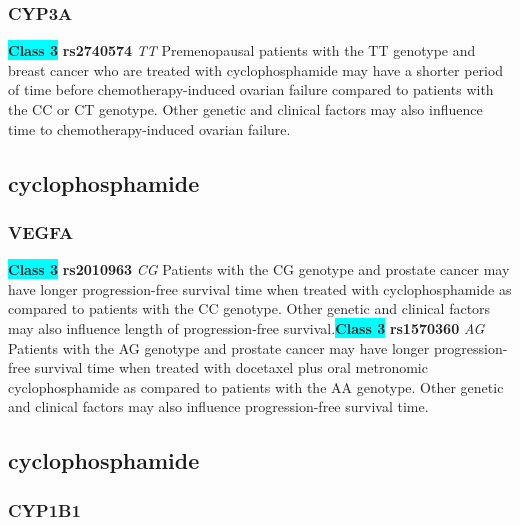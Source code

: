 \documentclass{book}
\begin{document}
\subsubsection{ CYP3A }

\begin{center}
\textbf{\colorbox{cyan} {Class 3}} \textbf{ rs2740574 } \textit{ TT }
Premenopausal patients with the TT genotype and breast cancer who are treated with cyclophosphamide may have a shorter period of time before chemotherapy-induced ovarian failure compared to patients with the CC or CT genotype. Other genetic and clinical factors may also influence time to chemotherapy-induced ovarian failure.


\end{center}\subsection{ cyclophosphamide }


\subsubsection{ VEGFA }

\begin{center}
\textbf{\colorbox{cyan} {Class 3}} \textbf{ rs2010963 } \textit{ CG }
Patients with the CG genotype and prostate cancer may have longer progression-free survival time when treated with cyclophosphamide as compared to patients with the CC genotype. Other genetic and clinical factors may also influence length of progression-free survival.\textbf{\colorbox{cyan} {Class 3}} \textbf{ rs1570360 } \textit{ AG }
Patients with the AG genotype and prostate cancer may have longer progression-free survival time when treated with docetaxel plus oral metronomic cyclophosphamide as compared to patients with the AA genotype. Other genetic and clinical factors may also influence progression-free survival time.


\end{center}\subsection{ cyclophosphamide }


\subsubsection{ CYP1B1 }
\end{document}
